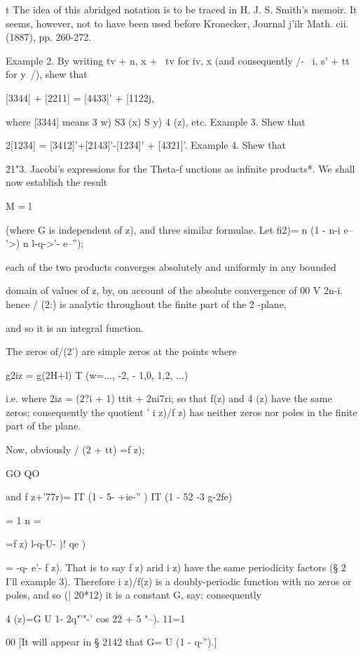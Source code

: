 t The idea of this abridged notation is to be traced in H. J. S.
Smith's memoir. It seems, however, not to have been used before
Kronecker, Journal j'ilr Math. cii. (1887), pp. 260-272.

%
%

Example 2. By writing tv + n, x + \ tv for iv, x (and consequently /-
\ i, s' + tt for y\ /), shew that

[3344] + [2211] = [4433]' + [1122j,

where [3344] means 3 w) S3 (x) S y) 4 (z), etc. Example 3. Shew that

2[1234] = [3412]'+[2143]'-[1234]' + [4321]'. Example 4. Shew that

21"3. Jacobi's expressions for the Theta-f unctions as infinite
products*. We shall now establish the result

M = l

(where G is independent of z), and three similar formulae. Let fi2)= n
(1 - n-i e-- '>) n l-q->'- e--'');

each of the two products converges absolutely and uniformly in any
bounded

domain of values of z, by, on account of the absolute
convergence of 00 V 2n-i. hence / (2:) is analytic throughout the
finite part of the 2 -plane,

and so it is an integral function.

The zeros of/(2') are simple zeros at the points where

g2iz = g(2H+l) T (w=..., -2, - 1,0, 1,2, ...)

i.e. where 2iz = (2?i + 1) ttit + 2ni7ri; so that f(z) and 4 (z) have
the same zeros; consequently the quotient ' i z)/f z) has neither
zeros nor poles in the finite part of the plane.

Now, obviously / (2 + tt) =f z);

GO QO

and f z+'77r)= IT (1 - 5- +ie-'' ) IT (1 - 52 -3 g-2fe)

  = 1 n = \

=f z) l-q-U- )! qe )

= -q- e'- f z). That is to say f z) arid i z) have the same
periodicity factors (§ 2 I'll example 3). Therefore i z)/f(z) is a
doubly-periodic function with no zeros or poles, and so (| 20*12) it
is a constant G, say; consequently

 4 (z)=G U 1- 2q"'"-' cos 22 + 5 "--). 11=1

00 [It will appear in § 2142 that G= U (1 - q-'').]

